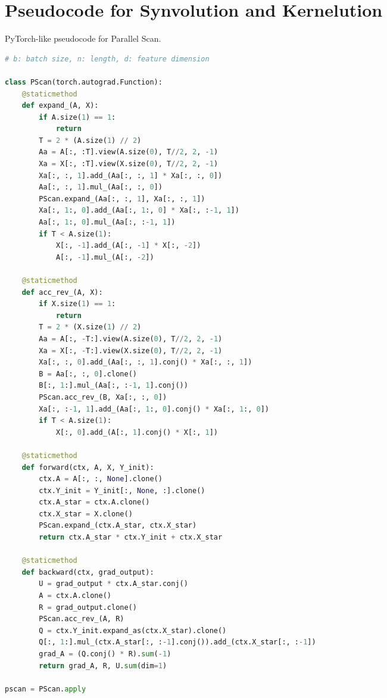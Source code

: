\section{Pseudocode for Synvolution and Kernelution}
\begin{algorithm}[!h]
\caption{PyTorch-like pseudocode for Parallel Scan.}
\label{alg:pscan}
\begin{lstlisting}[language=python]
# b: batch size, n: length, d: feature dimension

class PScan(torch.autograd.Function):
    @staticmethod
    def expand_(A, X):
        if A.size(1) == 1:
            return
        T = 2 * (A.size(1) // 2)
        Aa = A[:, :T].view(A.size(0), T//2, 2, -1)
        Xa = X[:, :T].view(X.size(0), T//2, 2, -1)
        Xa[:, :, 1].add_(Aa[:, :, 1] * Xa[:, :, 0])
        Aa[:, :, 1].mul_(Aa[:, :, 0])
        PScan.expand_(Aa[:, :, 1], Xa[:, :, 1])
        Xa[:, 1:, 0].add_(Aa[:, 1:, 0] * Xa[:, :-1, 1])
        Aa[:, 1:, 0].mul_(Aa[:, :-1, 1])
        if T < A.size(1):
            X[:, -1].add_(A[:, -1] * X[:, -2])
            A[:, -1].mul_(A[:, -2])

    @staticmethod
    def acc_rev_(A, X):
        if X.size(1) == 1:
            return
        T = 2 * (X.size(1) // 2)
        Aa = A[:, -T:].view(A.size(0), T//2, 2, -1)
        Xa = X[:, -T:].view(X.size(0), T//2, 2, -1)
        Xa[:, :, 0].add_(Aa[:, :, 1].conj() * Xa[:, :, 1])
        B = Aa[:, :, 0].clone()
        B[:, 1:].mul_(Aa[:, :-1, 1].conj())
        PScan.acc_rev_(B, Xa[:, :, 0])
        Xa[:, :-1, 1].add_(Aa[:, 1:, 0].conj() * Xa[:, 1:, 0])
        if T < A.size(1):
            X[:, 0].add_(A[:, 1].conj() * X[:, 1])

    @staticmethod
    def forward(ctx, A, X, Y_init):
        ctx.A = A[:, :, None].clone()
        ctx.Y_init = Y_init[:, None, :].clone()
        ctx.A_star = ctx.A.clone()
        ctx.X_star = X.clone()
        PScan.expand_(ctx.A_star, ctx.X_star)
        return ctx.A_star * ctx.Y_init + ctx.X_star

    @staticmethod
    def backward(ctx, grad_output):
        U = grad_output * ctx.A_star.conj()
        A = ctx.A.clone()
        R = grad_output.clone()
        PScan.acc_rev_(A, R)
        Q = ctx.Y_init.expand_as(ctx.X_star).clone()
        Q[:, 1:].mul_(ctx.A_star[:, :-1].conj()).add_(ctx.X_star[:, :-1])
        grad_A = (Q.conj() * R).sum(-1)
        return grad_A, R, U.sum(dim=1)

pscan = PScan.apply
\end{lstlisting}
\end{algorithm}

